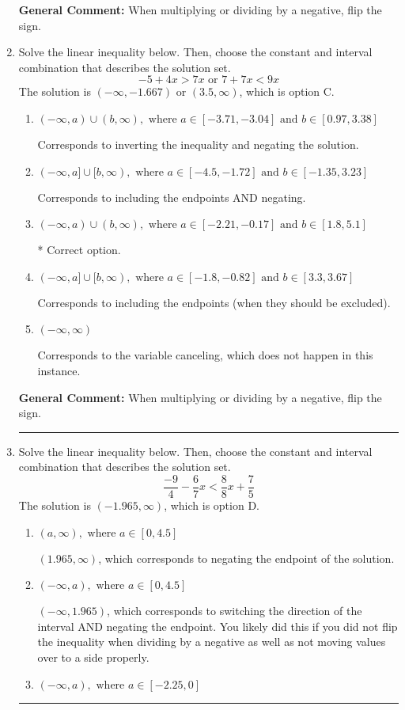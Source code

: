 \documentclass{extbook}[14pt]
\newcommand{\litem}[1]{\item #1

\rule{\textwidth}{0.4pt}}
\begin{document}
\begin{enumerate}
{\textbf{General Comment:} When multiplying or dividing by a negative, flip the sign.
}
\litem{
Solve the linear inequality below. Then, choose the constant and interval combination that describes the solution set.
\[ -5 + 4 x > 7 x \text{ or } 7 + 7 x < 9 x \]The solution is \( (-\infty, -1.667) \text{ or } (3.5, \infty) \), which is option C.\begin{enumerate}[label=\Alph*.]
\item \( (-\infty, a) \cup (b, \infty), \text{ where } a \in [-3.71, -3.04] \text{ and } b \in [0.97, 3.38] \)

Corresponds to inverting the inequality and negating the solution.
\item \( (-\infty, a] \cup [b, \infty), \text{ where } a \in [-4.5, -1.72] \text{ and } b \in [-1.35, 3.23] \)

Corresponds to including the endpoints AND negating.
\item \( (-\infty, a) \cup (b, \infty), \text{ where } a \in [-2.21, -0.17] \text{ and } b \in [1.8, 5.1] \)

 * Correct option.
\item \( (-\infty, a] \cup [b, \infty), \text{ where } a \in [-1.8, -0.82] \text{ and } b \in [3.3, 3.67] \)

Corresponds to including the endpoints (when they should be excluded).
\item \( (-\infty, \infty) \)

Corresponds to the variable canceling, which does not happen in this instance.
\end{enumerate}

\textbf{General Comment:} When multiplying or dividing by a negative, flip the sign.
}
\litem{
Solve the linear inequality below. Then, choose the constant and interval combination that describes the solution set.
\[ \frac{-9}{4} - \frac{6}{7} x < \frac{8}{8} x + \frac{7}{5} \]The solution is \( (-1.965, \infty) \), which is option D.\begin{enumerate}[label=\Alph*.]
\item \( (a, \infty), \text{ where } a \in [0, 4.5] \)

 $(1.965, \infty)$, which corresponds to negating the endpoint of the solution.
\item \( (-\infty, a), \text{ where } a \in [0, 4.5] \)

 $(-\infty, 1.965)$, which corresponds to switching the direction of the interval AND negating the endpoint. You likely did this if you did not flip the inequality when dividing by a negative as well as not moving values over to a side properly.
\item \( (-\infty, a), \text{ where } a \in [-2.25, 0] \)


\end{enumerate}}
\end{enumerate}
\end{document}
